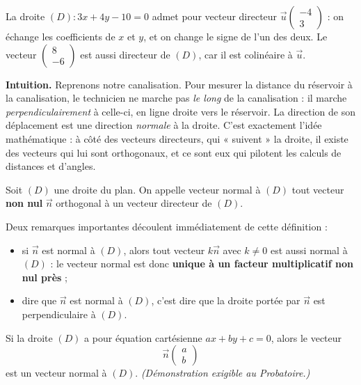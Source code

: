 \documentclass[11pt]{article}
\newcommand{\cle}[1]{{\popxbold\color{popdark}#1}}
\newcounter{popsec}
\newcounter{popsub}
\newcommand{\courssub}[1]{%
  \stepcounter{popsub}%
  \par\vspace{9pt}\noindent{\popxbold\fontsize{11.5}{13}\selectfont\color{popink}{\color{poporange}\thepopsec.\thepopsub}\hspace{6pt}#1}\par\nopagebreak\vspace{4pt}
}
\begin{document}
\begin{exemplebox}
La droite $(D) : 3x + 4y - 10 = 0$ admet pour vecteur directeur $\vec{u}\begin{pmatrix} -4 \\ 3 \end{pmatrix}$ : on échange les coefficients de $x$ et $y$, et on change le signe de l'un des deux. Le vecteur $\begin{pmatrix} 8 \\ -6 \end{pmatrix}$ est aussi directeur de $(D)$, car il est colinéaire à $\vec{u}$.
\end{exemplebox}

\courssub{Vecteur normal à une droite}

\textbf{Intuition.} Reprenons notre canalisation. Pour mesurer la distance du réservoir à la canalisation, le technicien ne marche pas \emph{le long} de la canalisation : il marche \emph{perpendiculairement} à celle-ci, en ligne droite vers le réservoir. La direction de son déplacement est une direction \emph{normale} à la droite. C'est exactement l'idée mathématique : à côté des vecteurs directeurs, qui « suivent » la droite, il existe des vecteurs qui lui sont orthogonaux, et ce sont eux qui pilotent les calculs de distances et d'angles.

\begin{definition}
Soit $(D)$ une droite du plan. On appelle \cle{vecteur normal} à $(D)$ tout vecteur \textbf{non nul} $\vec{n}$ orthogonal à un vecteur directeur de $(D)$.
\end{definition}

Deux remarques importantes découlent immédiatement de cette définition :
\begin{itemize}
\item si $\vec{n}$ est normal à $(D)$, alors tout vecteur $k\vec{n}$ avec $k \neq 0$ est aussi normal à $(D)$ : le vecteur normal est donc \textbf{unique à un facteur multiplicatif non nul près} ;
\item dire que $\vec{n}$ est normal à $(D)$, c'est dire que la droite portée par $\vec{n}$ est perpendiculaire à $(D)$.
\end{itemize}

\begin{propriete}
Si la droite $(D)$ a pour équation cartésienne $ax+by+c=0$, alors le vecteur
\[ \vec{n}\begin{pmatrix} a \\ b \end{pmatrix} \]
est un vecteur normal à $(D)$. \emph{(Démonstration exigible au Probatoire.)}
\end{propriete}
\end{document}
